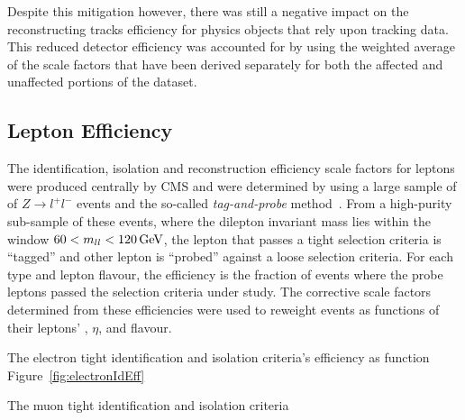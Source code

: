 Despite this mitigation however, there was still a negative impact on the reconstructing tracks efficiency for physics objects that rely upon tracking data.
This reduced detector efficiency was accounted for by using the weighted average of the scale factors that have been derived separately for both the affected and unaffected portions of the dataset.

\subsection{Lepton Efficiency}\label{subsec:leptonRecoSFs}
The identification, isolation and reconstruction efficiency scale factors for leptons were produced centrally by CMS and were determined by using a large sample of of $Z \rightarrow l^{+} l ^{-}$ events and the so-called \emph{tag-and-probe} method~\cite{CMS:2008rxa}.
From a high-purity sub-sample of these events, where the dilepton invariant mass lies within the window $60 < m_{ll} < 120 \,\text{Ge\hspace{-.08em}V}$, the lepton that passes a tight selection criteria is ``tagged'' and other lepton is ``probed'' against a loose selection criteria.
For each type and lepton flavour, the efficiency is the fraction of events where the probe leptons passed the selection criteria under study.
The corrective scale factors determined from these efficiencies were used to reweight events as functions of their leptons' \pt, $\eta$, and flavour.

The electron tight identification and isolation criteria's efficiency  as function Figure~\ref{fig:electronIdEff}

The muon tight identification and isolation criteria

